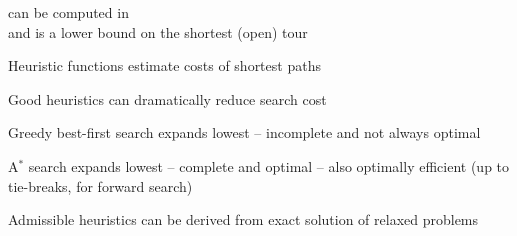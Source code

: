 \documentclass{article}
\def\Astar{A$^*$}
\begin{document}
\begin{huge}
\vspace*{0.3in}

\textwidth
{}

 can be computed in \\
and is a lower bound on the shortest (open) tour



Heuristic functions estimate costs of shortest paths

Good heuristics can dramatically reduce search cost 

Greedy best-first search expands lowest \al
  -- incomplete and not always optimal

{\Astar} search expands lowest \al
  -- complete and optimal\al
  -- also optimally efficient (up to tie-breaks, for forward search)

Admissible heuristics can be derived from exact solution of relaxed problems

\end{huge}
\end{document}

